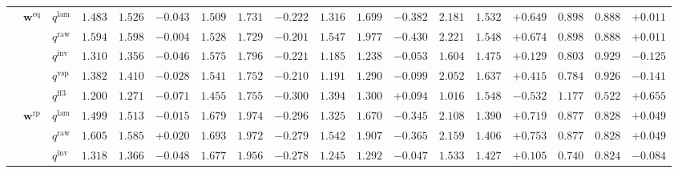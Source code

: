 \documentclass{article}
\begin{document}
\begin{table}[!htbp]
{\begin{tabular}{lll ccc ccc ccc ccc ccc}
\cmidrule(lr){2-18}
 & $\mathbf{w}^{\mathrm{eq}}$ & $q^{\mathrm{lam}}$ & $1.483$ & $1.526$ & \cellcolor{negred!50}$-0.043$ & $1.509$ & $1.731$ & \cellcolor{negred!50}$-0.222$ & $1.316$ & $1.699$ & \cellcolor{negred!50}$-0.382$ & $2.181$ & $1.532$ & \cellcolor{posgreen!50}$+0.649$ & $0.898$ & $0.888$ & \cellcolor{posgreen!50}$+0.011$ \\
 &  & $q^{\mathrm{raw}}$ & $1.594$ & $1.598$ & \cellcolor{negred!50}$-0.004$ & $1.528$ & $1.729$ & \cellcolor{negred!50}$-0.201$ & $1.547$ & $1.977$ & \cellcolor{negred!50}$-0.430$ & $2.221$ & $1.548$ & \cellcolor{posgreen!50}$+0.674$ & $0.898$ & $0.888$ & \cellcolor{posgreen!50}$+0.011$ \\
 &  & $q^{\mathrm{inv}}$ & $1.310$ & $1.356$ & \cellcolor{negred!50}$-0.046$ & $1.575$ & $1.796$ & \cellcolor{negred!50}$-0.221$ & $1.185$ & $1.238$ & \cellcolor{negred!50}$-0.053$ & $1.604$ & $1.475$ & \cellcolor{posgreen!50}$+0.129$ & $0.803$ & $0.929$ & \cellcolor{negred!50}$-0.125$ \\
 &  & $q^{\mathrm{vsp}}$ & $1.382$ & $1.410$ & \cellcolor{negred!50}$-0.028$ & $1.541$ & $1.752$ & \cellcolor{negred!50}$-0.210$ & $1.191$ & $1.290$ & \cellcolor{negred!50}$-0.099$ & $2.052$ & $1.637$ & \cellcolor{posgreen!50}$+0.415$ & $0.784$ & $0.926$ & \cellcolor{negred!50}$-0.141$ \\
 &  & $q^{\mathrm{ff3}}$ & $1.200$ & $1.271$ & \cellcolor{negred!50}$-0.071$ & $1.455$ & $1.755$ & \cellcolor{negred!50}$-0.300$ & $1.394$ & $1.300$ & \cellcolor{posgreen!50}$+0.094$ & $1.016$ & $1.548$ & \cellcolor{negred!50}$-0.532$ & $1.177$ & $0.522$ & \cellcolor{posgreen!50}$+0.655$ \\
\cmidrule(lr){2-18}
 & $\mathbf{w}^{\mathrm{rp}}$ & $q^{\mathrm{lam}}$ & $1.499$ & $1.513$ & \cellcolor{negred!50}$-0.015$ & $1.679$ & $1.974$ & \cellcolor{negred!50}$-0.296$ & $1.325$ & $1.670$ & \cellcolor{negred!50}$-0.345$ & $2.108$ & $1.390$ & \cellcolor{posgreen!50}$+0.719$ & $0.877$ & $0.828$ & \cellcolor{posgreen!50}$+0.049$ \\
 &  & $q^{\mathrm{raw}}$ & $1.605$ & $1.585$ & \cellcolor{posgreen!50}$+0.020$ & $1.693$ & $1.972$ & \cellcolor{negred!50}$-0.279$ & $1.542$ & $1.907$ & \cellcolor{negred!50}$-0.365$ & $2.159$ & $1.406$ & \cellcolor{posgreen!50}$+0.753$ & $0.877$ & $0.828$ & \cellcolor{posgreen!50}$+0.049$ \\
 &  & $q^{\mathrm{inv}}$ & $1.318$ & $1.366$ & \cellcolor{negred!50}$-0.048$ & $1.677$ & $1.956$ & \cellcolor{negred!50}$-0.278$ & $1.245$ & $1.292$ & \cellcolor{negred!50}$-0.047$ & $1.533$ & $1.427$ & \cellcolor{posgreen!50}$+0.105$ & $0.740$ & $0.824$ & \cellcolor{negred!50}$-0.084$ \\

\end{tabular}}
\end{table}
\end{document}
